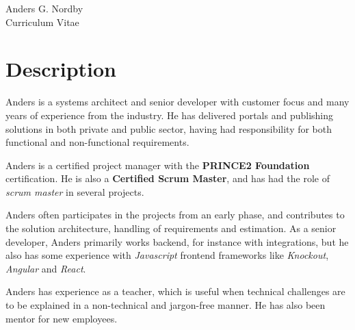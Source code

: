 \documentclass[10pt]{article} %
\begin{document}
\begin{paracol}{2} %


\parbox[top][0.12\textheight][c]{\linewidth}{ %
	\vspace{-0.04\textheight} %
	\centering %
	{\sffamily\Huge Anders G. Nordby}\\\medskip %
	{\Huge\color{headings}\cvtextfont Curriculum Vitae}
}


\section{Description}

Anders is a systems architect and senior developer with customer focus and many years of
experience from the industry. He has delivered portals and publishing solutions in both private
and public sector, having had responsibility for both functional and non-functional requirements.
\medskip

Anders is a certified project manager with the \textbf{PRINCE2 Foundation} certification. He is also
a \textbf{Certified Scrum Master}, and has had the role of \textit{scrum master} in several projects.
\medskip

Anders often participates in the projects from an early phase, and contributes to the solution
architecture, handling of requirements and estimation. As a senior developer, 
Anders primarily works backend, for instance with integrations, but he also has some experience with 
\textit{Javascript} frontend frameworks like \textit{Knockout}, \textit{Angular} and \textit{React}.
\medskip

Anders has experience as a teacher, which is useful when technical challenges are to be explained 
in a non-technical and jargon-free manner. He has also been mentor for new employees.
\medskip


\end{paracol}
\end{document}
